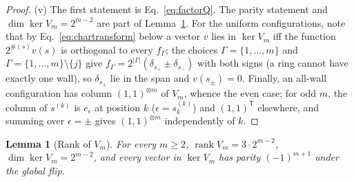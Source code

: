 \documentclass[aps,prx,reprint,superscriptaddress,nobibnotes,longbibliography]{revtex4-2}
\newtheorem{lemma}{Lemma}
\theoremstyle{remark}
\newcommand{\rk}{\operatorname{rank}}
\begin{document}
\begin{proof}
(v) The first statement is Eq.~\eqref{eq:factorQ}.  The parity statement and $\dim\ker V_m=2^{m-2}$ are part of Lemma~\ref{lem:rank}.  For the uniform configurations, note that by Eq.~\eqref{eq:chartransform} below a vector $v$ lies in $\ker V_m$ iff the function $2^{\#(s)}v(s)$ is orthogonal to every $f_\Gamma$; the choices $\Gamma=\{1,\ldots,m\}$ and $\Gamma=\{1,\ldots,m\}\setminus\{j\}$ give $f_\Gamma=2^{|\Gamma|}(\delta_{s_+}\pm\delta_{s_-})$ with both signs (a ring cannot have exactly one wall), so $\delta_{s_\pm}$ lie in the span and $v(s_\pm)=0$.  Finally, an all-wall configuration has column $(1,1)^{\otimes m}$ of $V_m$, whence the even case; for odd $m$, the column of $s^{(k)}$ is $e_{\epsilon}$ at position $k$ ($\epsilon=s^{(k)}_k$) and $(1,1)^{\mathsf T}$ elsewhere, and summing over $\epsilon=\pm$ gives $(1,1)^{\otimes m}$ independently of $k$.
\end{proof}

\begin{lemma}[Rank of $V_m$]
\label{lem:rank}
For every $m\ge2$, $\rk V_m=3\cdot2^{m-2}$, $\dim\ker V_m=2^{m-2}$, and every vector in $\ker V_m$ has parity $(-1)^{m+1}$ under the global flip.
\end{lemma}
\end{document}
